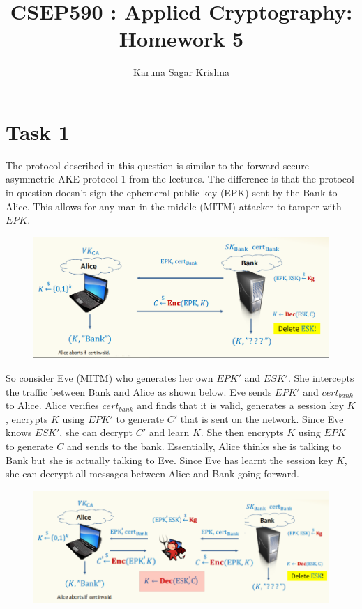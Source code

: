 \documentclass{article}
\title{CSEP590 : Applied Cryptography: Homework 5}
\author{Karuna Sagar Krishna}
\begin{document}
    \maketitle

    \section*{Task 1}
    The protocol described in this question is similar to the forward secure asymmetric AKE protocol 1 from the lectures. The difference is that the protocol in question doesn't sign the ephemeral public key (EPK) sent by the Bank to Alice. This allows for any man-in-the-middle (MITM) attacker to tamper with $EPK$.

    \begin{figure}[H]
        \includegraphics[width=1\textwidth]{protocol.png}
    \end{figure}

    So consider Eve (MITM) who generates her own $EPK'$ and $ESK'$. She intercepts the traffic between Bank and Alice as shown below. Eve sends $EPK'$ and $cert_{bank}$ to Alice. Alice verifies $cert_{bank}$ and finds that it is valid, generates a session key $K$, encrypts $K$ using $EPK'$ to generate $C'$ that is sent on the network. Since Eve knows $ESK'$, she can decrypt $C'$ and learn $K$. She then encrypts $K$ using $EPK$ to generate $C$ and sends to the bank. Essentially, Alice thinks she is talking to Bank but she is actually talking to Eve. Since Eve has learnt the session key $K$, she can decrypt all messages between Alice and Bank going forward.

    \begin{figure}[H]
        \includegraphics[width=1\textwidth]{mitmAttack.png}
    \end{figure}
\end{document}
